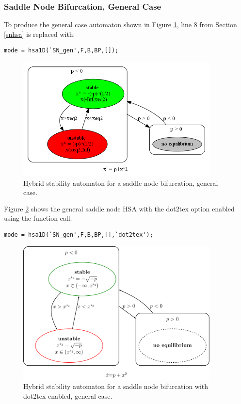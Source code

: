 \documentclass[12pt]{article}
\begin{document}
\subsubsection{Saddle Node Bifurcation, General Case}
\noindent To produce the general case automaton shown in Figure \ref{SN_gen}, line 8 from Section \ref{snhsa} is replaced with:

\begin{addmargin}[0.5in]{1em}
\begin{lstlisting}
mode = hsa1D(`SN_gen',F,B,BP,[]);
\end{lstlisting}
\end{addmargin}

\begin{figure}[H]
\begin{center}
\includegraphics[width=4in]{SN_gen.png}
\caption{Hybrid stability automaton for a saddle node bifurcation, general case.}
\label{SN_gen}
\end{center}
\end{figure}

\noindent Figure \ref{SN_gentex} shows the general saddle node HSA with the dot2tex option enabled using the function call:

\begin{addmargin}[0.5in]{1em}
\begin{lstlisting}
mode = hsa1D(`SN_gen',F,B,BP,[],`dot2tex');
\end{lstlisting}
\end{addmargin}

\begin{figure}[H]
\begin{center}
\includegraphics[width=4in]{SN_gentex.pdf}
\caption{Hybrid stability automaton for a saddle node bifurcation with dot2tex enabled, general case.}
\label{SN_gentex}
\end{center}
\end{figure}
\end{document}
